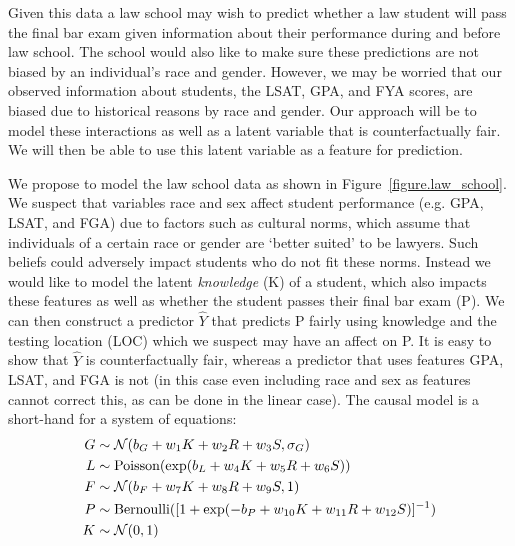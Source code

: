 Given this data a law school may wish to predict whether a law student will pass the final bar exam given information about their performance during and before law school. The school would also like to make sure these predictions are not biased by an individual's race and gender. However, we may be worried that our observed information about students, the LSAT, GPA, and FYA scores, are biased due to historical reasons by race and gender. Our approach will be to model these interactions as well as a latent variable that is counterfactually fair. We will then be able to use this latent variable as a feature for prediction.

We propose to model the law school data as shown in Figure~\ref{figure.law_school}. We suspect that variables race and sex affect student performance (e.g. GPA, LSAT, and FGA) due to factors such as cultural norms, which assume that individuals of a certain race or gender are `better suited' to be lawyers. Such beliefs could adversely impact students who do not fit these norms. Instead we would like to model the latent \emph{knowledge} (K) of a student, which also impacts these features as well as whether the student passes their final bar exam (P). We can then construct a predictor $\hat{Y}$ that predicts P fairly using knowledge and the testing location (LOC) which we suspect may have an affect on P. It is easy to show that $\hat{Y}$ is counterfactually fair, whereas a predictor that uses features GPA, LSAT, and FGA is not (in this case even including race and sex as features cannot correct this, as can be done in the linear case). The causal model is a short-hand for a system of equations:
\begin{align}
G &\sim {\cal N}(b_G + w_1 K + w_2 R + w_3 S, \sigma_G) \nonumber \\
L &\sim \textrm{Poisson}(\exp(b_L + w_4 K + w_5 R + w_6 S)) \nonumber \\
F &\sim {\cal N}(b_F + w_7 K + w_8 R + w_{9} S, 1) \nonumber \\
P &\sim \textrm{Bernoulli}([1+\exp(-b_P + w_{10} K + w_{11} R + w_{12} S)]^{-1}) \nonumber \\
K &\sim {\cal N}(0,1) \nonumber
\end{align}

 


